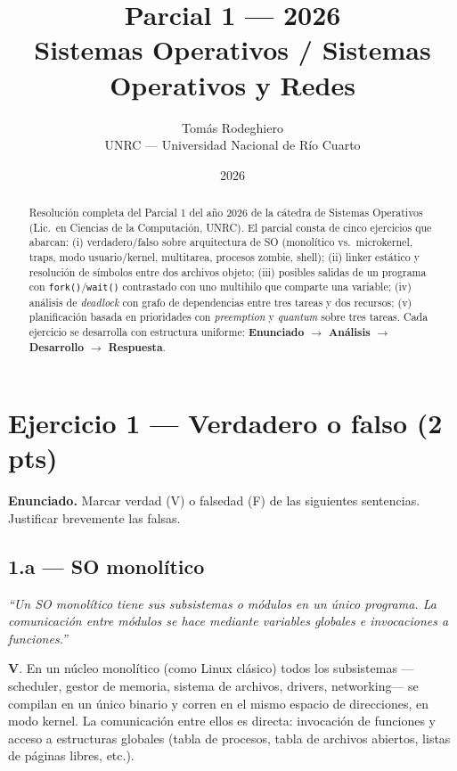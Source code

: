 \documentclass[11pt,a4paper]{article}
\title{
    \vspace{-2.5em}
    \textbf{Parcial 1 --- 2026} \\[0.3em]
    \large Sistemas Operativos / Sistemas Operativos y Redes
}
\author{
    Tomás Rodeghiero \\
    \small UNRC --- Universidad Nacional de Río Cuarto
}
\date{2026}
\begin{document}
\maketitle

\begin{abstract}
\noindent
Resolución completa del Parcial 1 del año 2026 de la cátedra de
Sistemas Operativos (Lic.\ en Ciencias de la Computación, UNRC). El
parcial consta de cinco ejercicios que abarcan: (i) verdadero/falso
sobre arquitectura de SO (monolítico vs.\ microkernel, traps, modo
usuario/kernel, multitarea, procesos zombie, shell); (ii) linker
estático y resolución de símbolos entre dos archivos objeto; (iii)
posibles salidas de un programa con \texttt{fork()}/\texttt{wait()}
contrastado con uno multihilo que comparte una variable; (iv) análisis
de \emph{deadlock} con grafo de dependencias entre tres tareas y dos
recursos; (v) planificación basada en prioridades con \emph{preemption}
y \emph{quantum} sobre tres tareas. Cada ejercicio se desarrolla con
estructura uniforme: \textbf{Enunciado $\to$ Análisis $\to$ Desarrollo
$\to$ Respuesta}.
\end{abstract}

\tableofcontents
\bigskip

\section{Ejercicio 1 --- Verdadero o falso (2 pts)}

\textbf{Enunciado.} Marcar verdad (V) o falsedad (F) de las siguientes
sentencias. Justificar brevemente las falsas.

\subsection*{1.a --- SO monolítico}

\emph{``Un SO monolítico tiene sus subsistemas o módulos en un único
programa. La comunicación entre módulos se hace mediante variables
globales e invocaciones a funciones.''}

\begin{respuesta}
\textbf{V}. En un núcleo monolítico (como Linux clásico) todos los
subsistemas ---scheduler, gestor de memoria, sistema de archivos,
drivers, networking--- se compilan en un único binario y corren en el
mismo espacio de direcciones, en modo kernel. La comunicación entre
ellos es directa: invocación de funciones y acceso a estructuras
globales (tabla de procesos, tabla de archivos abiertos, listas de
páginas libres, etc.).
\end{respuesta}
\end{document}
